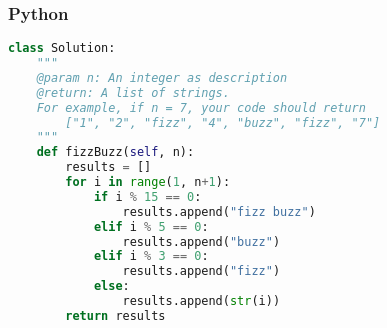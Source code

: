 \subsubsection{Python}
\begin{lstlisting}[language=Python]
class Solution:
    """
    @param n: An integer as description
    @return: A list of strings.
    For example, if n = 7, your code should return
        ["1", "2", "fizz", "4", "buzz", "fizz", "7"]
    """
    def fizzBuzz(self, n):
        results = []
        for i in range(1, n+1):
            if i % 15 == 0:
                results.append("fizz buzz")
            elif i % 5 == 0:
                results.append("buzz")
            elif i % 3 == 0:
                results.append("fizz")
            else:
                results.append(str(i))
        return results
\end{lstlisting}
\normalsize 
